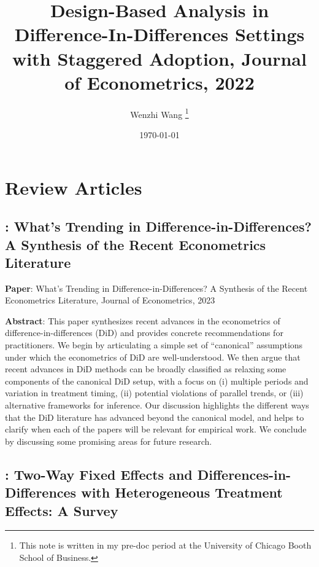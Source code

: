 \documentclass[12pt]{article}
\newcommand{\highlightP}[1]{{\emph{\color{MyPink}{#1}}}}
\theoremstyle{definition}
\begin{document}

\title{\bf Design-Based Analysis in Difference-In-Differences Settings with Staggered Adoption, Journal of Econometrics, 2022}
\author{Wenzhi Wang \thanks{This note is written in my pre-doc period at the University of Chicago Booth School of Business.} } 
\date{\today}
\maketitle

{\highlightP{INCOMPLETE SUMMARY}}

{\normalsize \tableofcontents}

\newpage

\section{Review Articles}

\subsection{\citet{rothWhatTrendingDifferenceinDifferences2023}: What's Trending in Difference-in-Differences? A Synthesis of the Recent Econometrics Literature}

{\bf Paper}: What's Trending in Difference-in-Differences? A Synthesis of the Recent Econometrics Literature, Journal of Econometrics, 2023

{\bf Abstract}: This paper synthesizes recent advances in the econometrics of difference-in-differences (DiD) and provides concrete recommendations for practitioners. We begin by articulating a simple set of ``canonical'' assumptions under which the econometrics of DiD are well-understood. We then argue that recent advances in DiD methods can be broadly classified as relaxing some components of the canonical DiD setup, with a focus on (i) multiple periods and variation in treatment timing, (ii) potential violations of parallel trends, or (iii) alternative frameworks for inference. Our discussion highlights the different ways that the DiD literature has advanced beyond the canonical model, and helps to clarify when each of the papers will be relevant for empirical work. We conclude by discussing some promising areas for future research.

\subsection{\citet{dechaisemartinTwoWayFixedEffects2023}: Two-Way Fixed Effects and Differences-in-Differences with Heterogeneous Treatment Effects: A Survey}
\end{document}
